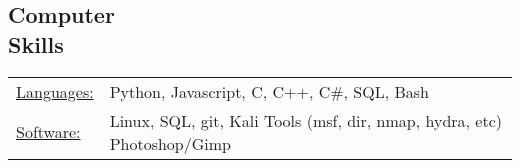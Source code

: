 \documentclass[margin]{res}
\begin{document}
\begin{resume}



\section{Computer \\ Skills}
   \begin{tabular}{l p{3in}}
    \underline{Languages:} & Python, Javascript, C, C++, C\#, SQL, Bash\\

	   \underline{Software:} &  Linux, SQL, git, Kali Tools (msf, dir, nmap, hydra, etc) Photoshop/Gimp
 \end{tabular}

\end{resume}
\end{document}
